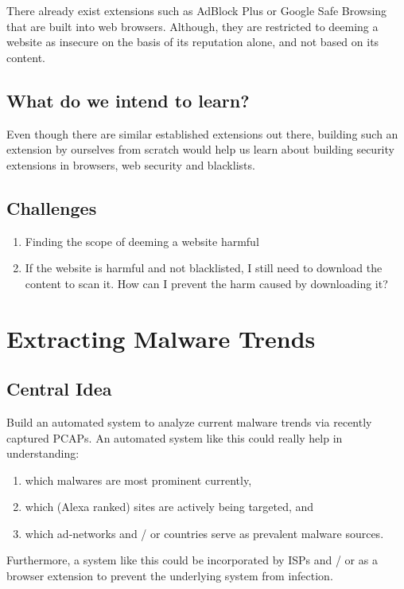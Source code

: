\documentclass[a4paper]{article}
\begin{document}
There already exist extensions such as AdBlock Plus\cite{adblock} or Google Safe Browsing\cite{googlesafe} that are built into web browsers. Although, they are restricted to deeming a website as insecure on the basis of its reputation alone, and not based on its content.

\subsection{What do we intend to learn?}

Even though there are similar established extensions out there, building such an extension by ourselves from scratch would help us learn about building security extensions in browsers, web security and blacklists.

\subsection{Challenges}
\begin{enumerate}
\item Finding the scope of deeming a website harmful

\item If the website is harmful and not blacklisted, I still need to download the content to scan it. How can I prevent the harm caused by downloading it?
\end{enumerate}

\section{Extracting Malware Trends}
\subsection{Central Idea}
Build an automated system to analyze current malware trends via recently captured PCAPs. An automated system like this could really help in understanding:
\begin{enumerate}
\item which malwares are most prominent currently, 
\item which (Alexa ranked) sites are actively being targeted, and 
\item which ad-networks and / or countries serve as prevalent malware sources. 
\end{enumerate}
Furthermore, a system like this could be incorporated by ISPs and / or as a browser extension to prevent the underlying system from infection.
\end{document}

